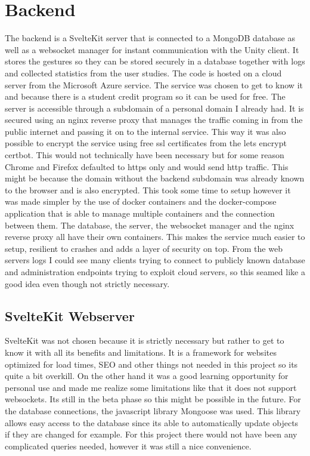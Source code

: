 




\chapter{Backend}

The backend is a SvelteKit server that is connected to a MongoDB database as well as a websocket manager for instant communication with the Unity client. It stores the gestures so they can be stored securely in a database together with logs and collected statistics from the user studies. The code is hosted on a cloud server from the Microsoft Azure service. The service was chosen to get to know it and because there is a student credit program so it can be used for free. The server is accessible through a subdomain of a personal domain I already had. It is secured using an nginx reverse proxy that manages the traffic coming in from the public internet and passing it on to the internal service. This way it was also possible to encrypt the service using free ssl certificates from the lets encrypt certbot. This would not technically have been necessary but for some reason Chrome and Firefox defaulted to https only and would send http traffic. This might be because the domain without the backend subdomain was already known to the browser and is also encrypted. This took some time to setup however it was made simpler by the use of docker containers and the docker-compose application that is able to manage multiple containers and the connection between them. The database, the server, the websocket manager and the nginx reverse proxy all have their own containers. This makes the service much easier to setup, resilient to crashes and adds a layer of security on top. From the web servers logs I could see many clients trying to connect to publicly known database and administration endpoints trying to exploit cloud servers, so this seamed like a good idea even though not strictly necessary. 

\section{SvelteKit Webserver}
SvelteKit was not chosen because it is strictly necessary but rather to get to know it with all its benefits and limitations. It is a framework for websites optimized for load times, SEO and other things not needed in this project so its quite a bit overkill. On the other hand it was a good learning opportunity for personal use and made me realize some limitations like that it does not support websockets. Its still in the beta phase so this might be possible in the future. For the database connections, the javascript library Mongoose was used. This library allows easy access to the database since its able to automatically update objects if they are changed for example. For this project there would not have been any complicated queries needed, however it was still a nice convenience. 

